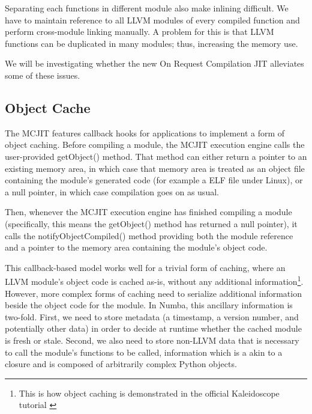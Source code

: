 \documentclass{acm_proc_article-sp}
\begin{document}
Separating each functions in different module also make inlining difficult.
We have to maintain reference to all LLVM modules of every compiled function
and perform cross-module linking manually. A problem for this is that
LLVM functions can be duplicated in many modules; thus, increasing the memory
use.

We will be investigating whether the new On Request Compilation JIT
alleviates some of these issues.


\subsection{Object Cache}

The MCJIT features callback hooks for
applications to implement a form of object caching.
Before compiling a module, the MCJIT execution engine
calls the user-provided getObject() method.  That method can either
return a pointer to an existing memory area, in which case that
memory area is treated as an object file containing the module's
generated code (for example a ELF file under Linux), or a null pointer,
in which case compilation goes on as usual.

Then, whenever the MCJIT execution engine has finished compiling a
module (specifically, this means the getObject() method has returned
a null pointer), it calls the notifyObjectCompiled() method providing
both the module reference and a pointer to the memory area containing
the module's object code.

This callback-based model works well for a trivial form of caching,
where an LLVM module's object code is cached as-is, without any
additional information\footnote{This is how object caching is demonstrated in
the official Kaleidoscope tutorial \cite{llvmblog:kaleidoscope}}.
However, more complex forms of
caching need to serialize additional information beside the object code
for the module.  In Numba, this ancillary information is two-fold.  First,
we need to store metadata (a timestamp, a version number,
and potentially other data) in order to decide at runtime whether the
cached module is fresh or stale.  Second, we also need to store non-LLVM
data that is necessary to call the module's functions to be called,
information which is a akin to a closure and is composed of arbitrarily
complex Python objects.
\end{document}
